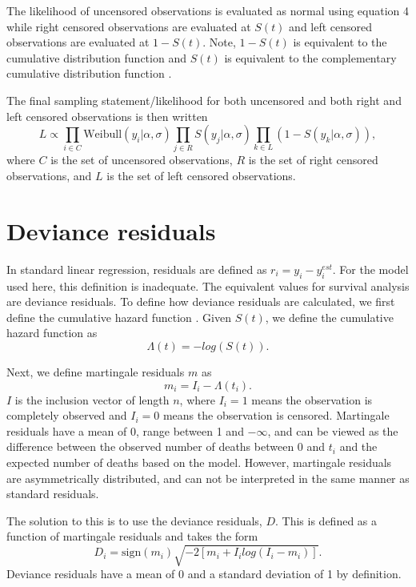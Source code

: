 \documentclass{article}
\begin{document}
The likelihood of uncensored observations is evaluated as normal using equation 4 while right censored observations are evaluated at \(S(t)\) and left censored observations are evaluated at \(1 - S(t)\). Note, \(1 - S(t)\) is equivalent to the cumulative distribution function and \(S(t)\) is equivalent to the complementary cumulative distribution function \cite{Gelman2013d}.

The final sampling statement/likelihood for both uncensored and both right and left censored observations is then written
\begin{equation*}
  L \propto \prod_{i \in C} \mathrm{Weibull}(y_{i} | \alpha, \sigma) \prod_{j \in R} S(y_j | \alpha, \sigma) \prod_{k \in L} \left(1 - S(y_{k} | \alpha, \sigma)\right),
\end{equation*}
where \(C\) is the set of uncensored observations, \(R\) is the set of right censored observations, and \(L\) is the set of left censored observations.

\section{Deviance residuals}
In standard linear regression, residuals are defined as \(r_{i} = y_{i} - y_{i}^{est}\). For the model used here, this definition is inadequate. The equivalent values for survival analysis are deviance residuals. To define how deviance residuals are calculated, we first define the cumulative hazard function \cite{Klein2003}. Given \(S(t)\), we define the cumulative hazard function as 
\begin{equation*}
  \Lambda(t) = -log\left(S\left(t\right)\right).
\end{equation*}

Next, we define martingale residuals \(m\) as
\begin{equation*}
  m_{i} = I_{i} - \Lambda(t_i).
\end{equation*}
\(I\) is the inclusion vector of length \(n\), where \(I_{i} = 1\) means the observation is completely observed and \(I_{i} = 0\) means the observation is censored. Martingale residuals have a mean of 0, range between 1 and \(-\infty\), and can be viewed as the difference between the observed number of deaths between 0 and \(t_{i}\) and the expected number of deaths based on the model. However, martingale residuals are asymmetrically distributed, and can not be interpreted in the same manner as standard residuals. 

The solution to this is to use the deviance residuals, \(D\). This is defined as a function of martingale residuals and takes the form
\begin{equation*}
  D_{i} = \text{sign}(m_{i}) \sqrt{-2[m_{i} + I_{i}log(I_{i} - m_{i})]}.
\end{equation*}
Deviance residuals have a mean of 0 and a standard deviation of 1 by definition.
\end{document}
